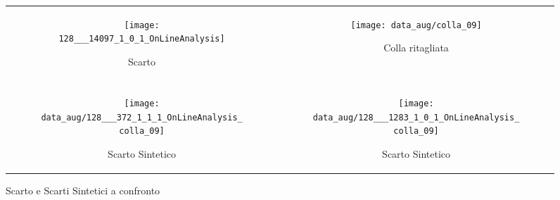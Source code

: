  \begin{figure}[ht] %
   \begin{center}
     \begin{tabular}{cc}

       \begin{subfigure}{.4\linewidth}
         \centering\texttt{[image: 128\_\_\_14097\_1\_0\_1\_OnLineAnalysis]}
         \caption{Scarto}
       \end{subfigure} &

       \begin{subfigure}{.4\linewidth}
         \centering\texttt{[image: data\_aug/colla\_09]}
         \caption{Colla ritagliata}
       \end{subfigure} \\ \\

       \begin{subfigure}{.4\linewidth}
         \centering\texttt{[image: data\_aug/128\_\_\_372\_1\_1\_1\_OnLineAnalysis\_colla\_09]}
         \caption{Scarto Sintetico}
       \end{subfigure} &

       \begin{subfigure}{.4\linewidth}
         \centering\texttt{[image: data\_aug/128\_\_\_1283\_1\_0\_1\_OnLineAnalysis\_colla\_09]}
         \caption{Scarto Sintetico}
       \end{subfigure} \\

     \end{tabular}
   \caption{Scarto e Scarti Sintetici a confronto}
   \label{fig:esempi_scarti_sintetici}
   \end{center}
 \end{figure}






























